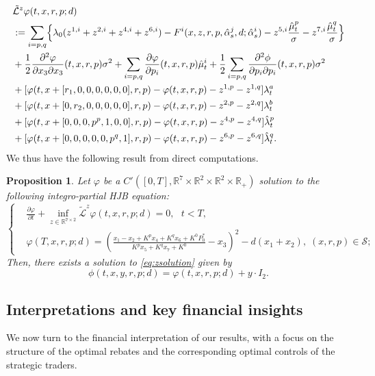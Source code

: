 \documentclass[12pt]{article}
\newtheorem{proposition}[theorem2]{Proposition}
\begin{document}
\begin{align*}
    &\tilde{\mathcal L}^z\varphi(t,x,r,p;d)\\
    &:= \sum_{i = p,q}  \Bigl\{\lambda_0(z^{1,i} + z^{2,i} +z^{4,i} +z^{6,i} ) - F^i(x,z,r,p, \hat \alpha^j_s,d;\hat \alpha^i_s) -  z^{5,i} \frac{\hat\mu^p_t}{\sigma} - z^{7,i} \frac{\hat\mu^q_t}{\sigma} \Bigl\} \\
    &+\frac{1}{2} \frac{\partial^2 \varphi}{\partial x_3 \partial x_3} (t, x,r,p) \sigma^2  + \sum_{i=p,q} \frac{\partial \varphi}{\partial p_i} (t, x,r,p)\hat\mu_t^i +\frac{1}{2}\sum_{i =p,q}  \frac{\partial^2 \phi}{\partial p_i \partial p_i} (t, x,r,p) \sigma^2 \\
    &+  [\varphi(t,x+[r_1 , 0,0, 0,0,0,0],r,p)  - \varphi(t, x,r,p) -z^{1,p}-z^{1,q}]  \lambda^a_t \\
    &+ [\varphi(t,x+[0 , r_2,0, 0,0,0,0],r,p)  - \varphi(t, x,r,p) -z^{2,p}-z^{2,q}]  \lambda^b_t\\
    &+ [\varphi(t,x+[0 , 0,0, p^p,1,0,0],r,p)  - \varphi(t, x,r,p) -z^{4,p}-z^{4,q}] \hat\lambda^p_t\\
    &+ [\varphi(t,x+[0 , 0,0, 0,0,p^q,1],r,p)  - \varphi(t, x,r,p) -z^{6,p}-z^{6,q}] \hat\lambda^q_t.
\end{align*}
We thus have the following result from direct computations. 
\begin{proposition}
    Let $\varphi$ be a $C'([0,T],\mathbb R^7\times  \mathbb R^2\times \mathbb R^2\times \mathbb R_+)$ solution to the following integro-partial HJB equation: 
       \begin{equation}
            \left\{
            \begin{aligned}
                &\frac{\partial \varphi}{\partial t} + \inf_{z\in \mathbb R^{7\times 2}} \tilde{\mathcal L}^z\varphi(t,x,r,p;d) = 0,\text{ }t<T, \\
                &\varphi(T,x,r,p;d) = \left(\frac{x_1 - x_2 + K^p x_4 + K^q x_6 + K^0 P_0^*}{K^p x_5 + K^q x_7 + K^0} - x_3\right)^2 - d(x_1 + x_2),\; (x,r,p)\in \mathcal S;
            \end{aligned}
            \right.
            \label{eq:zsolution:reduce} 
            \end{equation}
            Then, there exists a solution to \eqref{eq:zsolution} given by
            \[  \phi(t,x,y,r,p;d)=\varphi(t,x,r,p;d)+y\cdot I_2. \]
\end{proposition}

\subsection{Interpretations and key financial insights}
\label{sec:interpretresult}
We now turn to the financial interpretation of our results, with a focus on the structure of the optimal rebates and the corresponding optimal controls of the strategic traders. 
\end{document}
